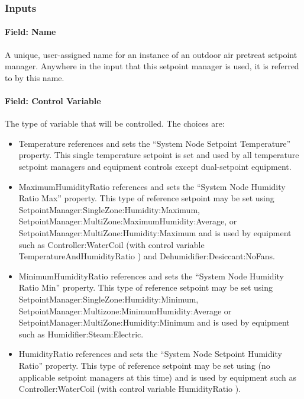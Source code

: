 \subsubsection{Inputs}\label{inputs-9-020}

\paragraph{Field: Name}\label{field-name-9-016}

A unique, user-assigned name for an instance of an outdoor air pretreat setpoint manager. Anywhere in the input that this setpoint manager is used, it is referred to by this name.

\paragraph{Field: Control Variable}\label{field-control-variable-9}

The type of variable that will be controlled. The choices are:

\begin{itemize}
\item
  Temperature references and sets the ``System Node Setpoint Temperature'' property. This single temperature setpoint is set and used by all temperature setpoint managers and equipment controls except dual-setpoint equipment.
\item
  MaximumHumidityRatio references and sets the ``System Node Humidity Ratio Max'' property. This type of reference setpoint may be set using SetpointManager:SingleZone:Humidity:Maximum, SetpointManager:MultiZone:MaximumHumidity:Average, or SetpointManager:MultiZone:Humidity:Maximum and is used by equipment such as Controller:WaterCoil (with control variable TemperatureAndHumidityRatio ) and Dehumidifier:Desiccant:NoFans.
\item
  MinimumHumidityRatio references and sets the ``System Node Humidity Ratio Min'' property. This type of reference setpoint may be set using SetpointManager:SingleZone:Humidity:Minimum, SetpointManager:Multizone:MinimumHumidity:Average or SetpointManager:MultiZone:Humidity:Minimum and is used by equipment such as Humidifier:Steam:Electric.
\item
  HumidityRatio references and sets the ``System Node Setpoint Humidity Ratio'' property. This type of reference setpoint may be set using (no applicable setpoint managers at this time) and is used by equipment such as Controller:WaterCoil (with control variable HumidityRatio ).
\end{itemize}

